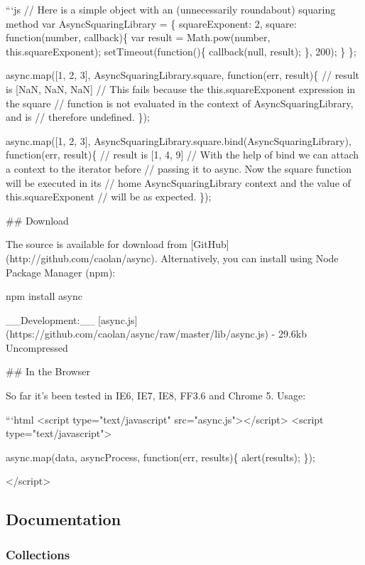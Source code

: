 ```js // Here is a simple object with an (unnecessarily roundabout) squaring method var Async\+Squaring\+Library = \{ square\+Exponent\+: 2, square\+: function(number, callback)\{ var result = Math.\+pow(number, this.\+square\+Exponent); set\+Timeout(function()\{ callback(null, result); \}, 200); \} \};

async.\+map(\mbox{[}1, 2, 3\mbox{]}, Async\+Squaring\+Library.\+square, function(err, result)\{ // result is \mbox{[}NaN, NaN, NaN\mbox{]} // This fails because the {\ttfamily this.\+square\+Exponent} expression in the square // function is not evaluated in the context of Async\+Squaring\+Library, and is // therefore undefined. \});

async.\+map(\mbox{[}1, 2, 3\mbox{]}, Async\+Squaring\+Library.\+square.\+bind(\+Async\+Squaring\+Library), function(err, result)\{ // result is \mbox{[}1, 4, 9\mbox{]} // With the help of bind we can attach a context to the iterator before // passing it to async. Now the square function will be executed in its // \textquotesingle{}home\textquotesingle{} Async\+Squaring\+Library context and the value of {\ttfamily this.\+square\+Exponent} // will be as expected. \}); 
\begin{DoxyCode}
## Download

The source is available for download from
[GitHub](http://github.com/caolan/async).
Alternatively, you can install using Node Package Manager (npm):

    npm install async

\_\_Development:\_\_ [async.js](https://github.com/caolan/async/raw/master/lib/async.js) - 29.6kb Uncompressed

## In the Browser

So far it's been tested in IE6, IE7, IE8, FF3.6 and Chrome 5. Usage:

```html
<script type="text/javascript" src="async.js"></script>
<script type="text/javascript">

    async.map(data, asyncProcess, function(err, results)\{
        alert(results);
    \});

</script>
\end{DoxyCode}


\subsection*{Documentation}

\subsubsection*{Collections}



